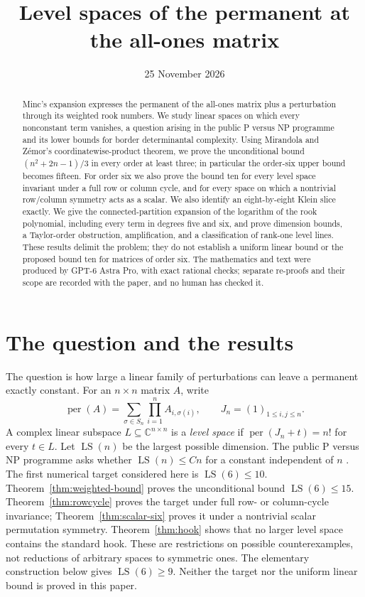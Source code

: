 \documentclass[11pt]{article}
\title{Level spaces of the permanent at the all-ones matrix}
\author{}
\date{25 November 2026}
\newcommand{\C}{\mathbb C}
\newcommand{\LS}{\operatorname{LS}}
\DeclareMathOperator{\per}{per}
\theoremstyle{definition}
\theoremstyle{remark}
\begin{document}
\maketitle
\begin{abstract}
Minc's expansion expresses the permanent of the all-ones matrix plus a perturbation through its weighted rook numbers. We study linear spaces on which every nonconstant term vanishes, a question arising in the public P versus NP programme and its lower bounds for border determinantal complexity. Using Mirandola and Z\'emor's coordinatewise-product theorem, we prove the unconditional bound $(n^2+2n-1)/3$ in every order at least three; in particular the order-six upper bound becomes fifteen. For order six we also prove the bound ten for every level space invariant under a full row or column cycle, and for every space on which a nontrivial row/column symmetry acts as a scalar. We also identify an eight-by-eight Klein slice exactly. We give the connected-partition expansion of the logarithm of the rook polynomial, including every term in degrees five and six, and prove dimension bounds, a Taylor-order obstruction, amplification, and a classification of rank-one level lines. These results delimit the problem; they do not establish a uniform linear bound or the proposed bound ten for matrices of order six. The mathematics and text were produced by GPT-6 Astra Pro, with exact rational checks; separate re-proofs and their scope are recorded with the paper, and no human has checked it.
\end{abstract}

\section{The question and the results}
The question is how large a linear family of perturbations can leave a permanent exactly constant.
For an $n\times n$ matrix $A$, write
\[
 \per(A)=\sum_{\sigma\in S_n}\prod_{i=1}^n A_{i,\sigma(i)},
 \qquad J_n=(1)_{1\leq i,j\leq n}.
\]
A complex linear subspace $L\subseteq\C^{n\times n}$ is a \emph{level space} if
$\per(J_n+t)=n!$ for every $t\in L$. Let $\LS(n)$ be the largest possible dimension.
The public P versus NP programme asks whether $\LS(n)\leq Cn$ for a constant independent of $n$ \citep{Fleet}.
The first numerical target considered here is $\LS(6)\leq10$.
Theorem~\ref{thm:weighted-bound} proves the unconditional bound $\LS(6)\le15$. Theorem~\ref{thm:rowcycle} proves the target under full row- or column-cycle invariance; Theorem~\ref{thm:scalar-six} proves it under a nontrivial scalar permutation symmetry. Theorem~\ref{thm:hook} shows that no larger level space contains the standard hook. These are restrictions on possible counterexamples, not reductions of arbitrary spaces to symmetric ones. The elementary construction below gives $\LS(6)\geq9$.
Neither the target nor the uniform linear bound is proved in this paper.
\end{document}
